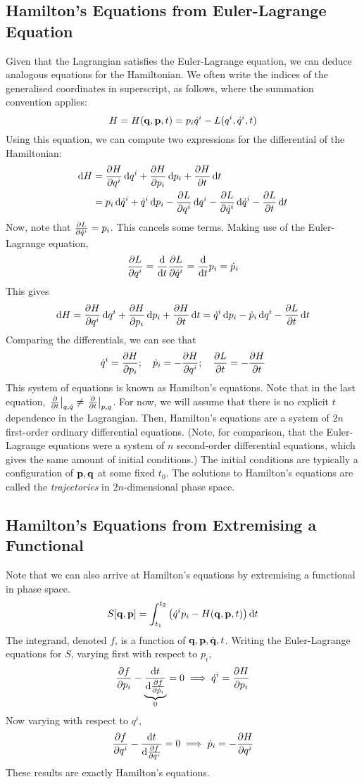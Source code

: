 \subsection{Hamilton's Equations from Euler-Lagrange Equation}
Given that the Lagrangian satisfies the Euler-Lagrange equation, we can deduce analogous equations for the Hamiltonian.
We often write the indices of the generalised coordinates in superscript, as follows, where the summation convention applies:
\[ H = H(\vb q, \vb p, t) = p_i \dot q^i - L(q^i, \dot q^i, t) \]
Using this equation, we can compute two expressions for the differential of the Hamiltonian:
\begin{align*}
    \dd{H} &= \pdv{H}{q^i} \dd{q^i} + \pdv{H}{p_i} \dd{p_i} + \pdv{H}{t} \dd{t} \\
    &= p_i \dd{\dot{q}^i} + \dot{q}^i \dd{p_i} - \pdv{L}{q^i}\dd{q^i} - \pdv{L}{\dot q^i}\dd{\dot q^i} - \pdv{L}{t}\dd{t}
\end{align*}
Now, note that \( \pdv{L}{\dot q^i} = p_i \).
This cancels some terms.
Making use of the Euler-Lagrange equation,
\[ \pdv{L}{q^i} = \dv{t} \pdv{L}{\dot q^i} = \dv{t} p_i = \dot{p}_i \]
This gives
\[ \dd{H} = \pdv{H}{q^i} \dd{q^i} + \pdv{H}{p_i} \dd{p_i} + \pdv{H}{t} \dd{t} = \dot{q}^i \dd{p_i} - \dot{p}_i\dd{q^i} - \pdv{L}{t}\dd{t} \]
Comparing the differentials, we can see that
\[ \dot{q}^i = \pdv{H}{p_i};\quad \dot{p}_i = -\pdv{H}{q^i};\quad \pdv{L}{t} = -\pdv{H}{t} \]
This system of equations is known as Hamilton's equations.
Note that in the last equation, \( \eval{\pdv{t}}_{q,\dot q} \neq \eval{\pdv{t}}_{p,q} \).
For now, we will assume that there is no explicit \( t \) dependence in the Lagrangian.
Then, Hamilton's equations are a system of \( 2n \) first-order ordinary differential equations.
(Note, for comparison, that the Euler-Lagrange equations were a system of \( n \) second-order differential equations, which gives the same amount of initial conditions.)
The initial conditions are typically a configuration of \( \vb p, \vb q \) at some fixed \( t_0 \).
The solutions to Hamilton's equations are called the \textit{trajectories} in \( 2n \)-dimensional phase space.

\subsection{Hamilton's Equations from Extremising a Functional}
Note that we can also arrive at Hamilton's equations by extremising a functional in phase space.
\[ S[\vb q, \vb p] = \int_{t_1}^{t_2} \qty( \dot q^i p_i - H(\vb q, \vb p, t)) \dd{t} \]
The integrand, denoted \( f \), is a function of \( \vb q, \vb p, \dot{\vb q}, t \).
Writing the Euler-Lagrange equations for \( S \), varying first with respect to \( p_i \),
\[ \pdv{f}{p_i} - \underbrace{\dv{t}{\pdv{f}{\dot p_i}}}_0 = 0 \implies \dot q^i = \pdv{H}{p_i} \]
Now varying with respect to \( q^i \),
\[ \pdv{f}{q^i} - \dv{t}{\pdv{f}{\dot q^i}} = 0 \implies \dot p_i = -\pdv{H}{q^i} \]
These results are exactly Hamilton's equations.

